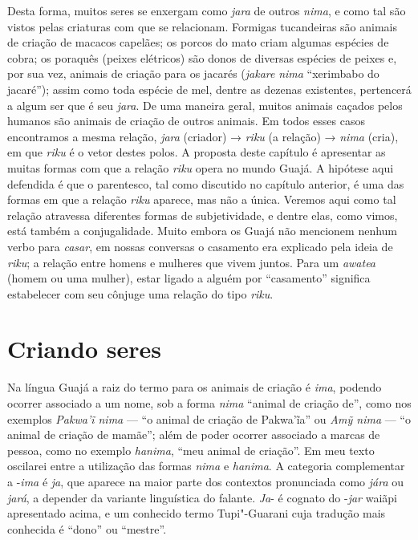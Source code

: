 Desta forma, muitos seres se enxergam como \emph{jara} de outros
\emph{nima}, e como tal são vistos pelas criaturas com que se
relacionam. Formigas tucandeiras são animais de criação de macacos
capelães; os porcos do mato criam algumas espécies de cobra; os poraquês
(peixes elétricos) são donos de diversas espécies de peixes e, por sua
vez, animais de criação para os jacarés (\emph{jakare} \emph{nima}
``xerimbabo do jacaré''); assim como toda espécie de mel, dentre as
dezenas existentes, pertencerá a algum ser que é seu \emph{jara}. De uma
maneira geral, muitos animais caçados pelos humanos são animais de
criação de outros animais. Em todos esses casos encontramos a mesma
relação, \emph{jara} (criador) → \emph{riku} (a relação) → \emph{nima}
(cria), em que \emph{riku} é o vetor destes polos. A proposta deste
capítulo é apresentar as muitas formas com que a relação \emph{riku}
opera no mundo Guajá. A hipótese aqui defendida é que o parentesco, tal
como discutido no capítulo anterior, é uma das formas em que a relação
\emph{riku} aparece, mas não a única. Veremos aqui como tal relação
atravessa diferentes formas de subjetividade, e dentre elas, como vimos,
está também a conjugalidade. Muito embora os Guajá não mencionem nenhum
verbo para \emph{casar}, em nossas conversas o casamento era explicado
pela ideia de \emph{riku}; a relação entre homens e mulheres que vivem
juntos. Para um \emph{awatea} (homem ou uma mulher), estar ligado a
alguém por ``casamento'' significa estabelecer com seu cônjuge uma relação
do tipo \emph{riku}.

\section{Criando seres}\label{criando-seres}

Na língua Guajá a raiz do termo para os animais de criação é \emph{ima},
podendo ocorrer associado a um nome, sob a forma \emph{nima} ``animal de
criação de'', como nos exemplos \emph{Pakwa'ĩ nima} --- ``o animal de
criação de Pakwa'ĩa'' ou \emph{Amỹ nima} --- ``o animal de criação de
mamãe''; além de poder ocorrer associado a marcas de pessoa, como no
exemplo \emph{hanima}, ``meu animal de criação''. Em meu texto oscilarei
entre a utilização das formas \emph{nima} e \emph{hanima}. A categoria
complementar a -\emph{ima} é \emph{ja}, que aparece na maior parte dos
contextos pronunciada como \emph{jára} ou \emph{jará}, a depender da
variante linguística do falante. \emph{Ja}- é cognato do -\emph{jar}
waiãpi apresentado acima, e um conhecido termo Tupi"-Guarani cuja
tradução mais conhecida é ``dono'' ou ``mestre''.

